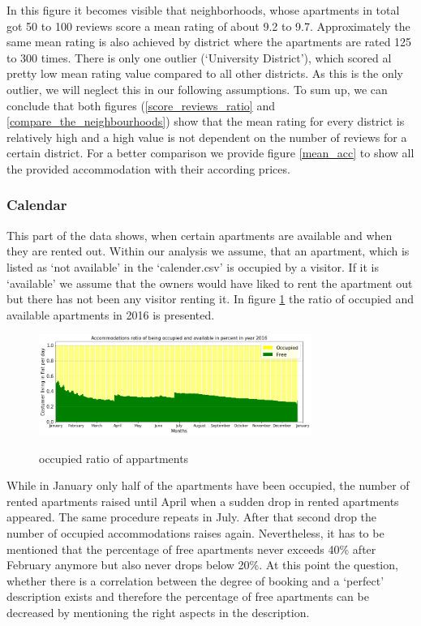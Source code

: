 \documentclass[journal]{IEEEtran}
\begin{document}
In this figure it becomes visible that neighborhoods, whose apartments in total got 50 to 100 reviews score a mean rating of about 9.2 to 9.7. Approximately the same mean rating is also achieved by district where the apartments are rated 125 to 300 times. There is only one outlier (‘University District’), which scored al pretty low mean rating value compared to all other districts. As this is the only outlier, we will neglect this in our following assumptions.
To sum up, we can conclude that both figures (\ref{score_reviews_ratio} and \ref{compare_the_neighbourhoods}) show that the mean rating for every district is relatively high and a high value is not dependent on the number of reviews for a certain district. For a better comparison we provide figure \ref{mean_acc} to show all the provided accommodation with their according prices.
\subsubsection{Calendar}
\noindent This part of the data shows, when certain apartments are available and when they are rented out. Within our analysis we assume, that an apartment, which is listed as ‘not available’ in the ‘calender.csv’ is occupied by a visitor. If it is ‘available’ we assume that the owners would have liked to rent the apartment out but there has not been any visitor renting it. In figure \ref{occupied_ratio_appartments} the ratio of occupied and available apartments in 2016 is presented.
%
\begin{figure}
  \begin{center}
  \includegraphics[width=3.5in]{photo/11_acc_ratio_occupied.png}\\
  \caption{occupied ratio of appartments}\label{occupied_ratio_appartments}
  \end{center}
\end{figure}
%
While in January only half of the apartments have been occupied, the number of rented apartments raised until April when a sudden drop in rented apartments appeared. The same procedure repeats in July. After that second drop the number of occupied accommodations raises again. Nevertheless, it has to be mentioned that the percentage of free apartments never exceeds 40\% after February anymore but also never drops below 20\%. At this point the question, whether there is a correlation between the degree of booking and a ‘perfect’ description exists and therefore the percentage of free apartments can be decreased by mentioning the right aspects in the description. 
\end{document}
